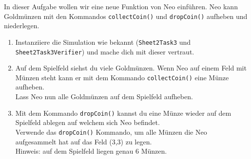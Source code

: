 

In dieser Aufgabe wollen wir eine neue Funktion von Neo einführen. 
Neo kann Goldmünzen mit den Kommandos \lstinline{collectCoin()} und \lstinline{dropCoin()} aufheben und niederlegen. 

\begin{enumerate}
    \item Instanziiere die Simulation wie bekannt (\lstinline{Sheet2Task3} und \lstinline{Sheet2Task3Verifier}) und mache dich mit dieser vertraut.
    \item Auf dem Spielfeld siehst du viele Goldmünzen.
        Wenn Neo auf einem Feld mit Münzen steht kann er mit dem Kommando \lstinline{collectCoin()} eine Münze aufheben.\\
        Lass Neo nun alle Goldmünzen auf dem Spielfeld aufheben.
    \item Mit dem Kommando \lstinline{dropCoin()} kannst du eine Münze wieder auf dem Spielfeld ablegen auf welchem sich Neo befindet.\\
        Verwende das \lstinline{dropCoin()} Kommando, um alle Münzen die Neo aufgesammelt hat auf das Feld (3,3) zu legen.\\
        Hinweis: auf dem Spielfeld liegen genau 6 Münzen.
\end{enumerate}


